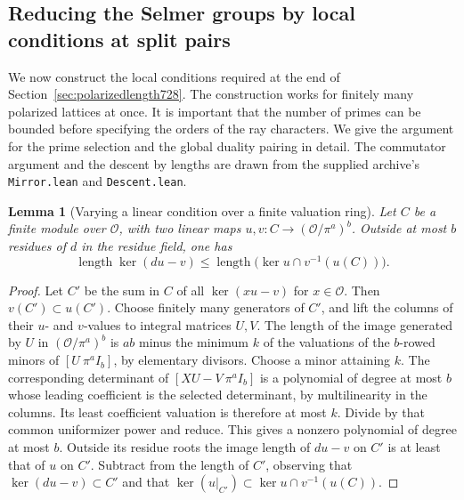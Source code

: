\documentclass[a4paper,11pt]{article}
\newtheorem{lemma}[proposition]{Lemma}
\theoremstyle{definition}
\theoremstyle{remark}
\numberwithin{equation}{section}
\begin{document}
\subsection{Reducing the Selmer groups by local conditions at split pairs}
\label{sec:pairedselmer729}

We now construct the local conditions required at the end of
Section~\ref{sec:polarizedlength728}. The construction works for
finitely many polarized lattices at once. It is important that the
number of primes can be bounded before specifying the orders of
the ray characters. We give the argument for the prime selection
and the global duality pairing in detail. The commutator argument
and the descent by lengths are drawn from the supplied archive's
\texttt{Mirror.lean} and \texttt{Descent.lean}.

\begin{lemma}[Varying a linear condition over a finite valuation ring]
\leavevmode\label{lem:slopecount729}
Let \(C\) be a finite module over \(\mathcal O\), with two linear
maps \(u,v:C\to(\mathcal O/\pi^a)^b\). Outside at most \(b\)
residues of \(d\) in the residue field, one has
\[
 \operatorname{length}\ker(d u-v)\le
       \operatorname{length}\bigl(\ker u\cap v^{-1}(u(C))\bigr).
\]
\end{lemma}
\begin{proof}
Let \(C'\) be the sum in \(C\) of all \(\ker(xu-v)\) for \(x\in\mathcal O\).
Then \(v(C')\subset u(C')\). Choose finitely many generators of \(C'\),
and lift the columns of their \(u\)- and \(v\)-values to integral
matrices \(U,V\). The length of the image generated by \(U\) in
\((\mathcal O/\pi^a)^b\) is \(ab\) minus the minimum \(k\) of the
valuations of the \(b\)-rowed minors of \([U\ \pi^a I_b]\), by elementary
divisors. Choose a minor attaining \(k\). The corresponding determinant
of \([XU-V\ \pi^a I_b]\) is a polynomial of degree at most \(b\)
whose leading coefficient is the selected determinant, by multilinearity
in the columns. Its least coefficient valuation is therefore at
most \(k\). Divide by that common uniformizer power and reduce. This
gives a nonzero polynomial of degree at most \(b\). Outside its residue
roots the image length of \(d u-v\) on \(C'\) is at least that of \(u\)
on \(C'\). Subtract from the length of \(C'\), observing that
\(\ker(d u-v)\subset C'\) and that \(\ker(u|_{C'})\subset
\ker u\cap v^{-1}(u(C))\).
\end{proof}
\end{document}
